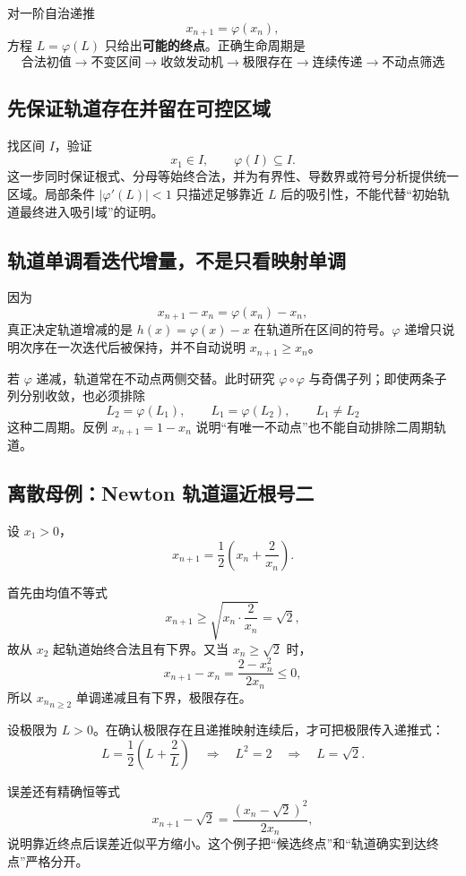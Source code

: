 \documentclass[11pt,a4paper]{ctexart}
\newcommand{\kw}[1]{\textbf{\color{deep}#1}}
\begin{document}
对一阶自治递推
\[
x_{n+1}=\varphi(x_n),
\]
方程 $L=\varphi(L)$ 只给出\kw{可能的终点}。正确生命周期是
\[
\boxed{
\text{合法初值}
\to \text{不变区间}
\to \text{收敛发动机}
\to \text{极限存在}
\to \text{连续传递}
\to \text{不动点筛选}}
\]

\subsection{先保证轨道存在并留在可控区域}

找区间 $I$，验证
\[
x_1\in I,\qquad \varphi(I)\subseteq I.
\]
这一步同时保证根式、分母等始终合法，并为有界性、导数界或符号分析提供统一区域。局部条件 $|\varphi'(L)|<1$ 只描述足够靠近 $L$ 后的吸引性，不能代替“初始轨道最终进入吸引域”的证明。

\subsection{轨道单调看迭代增量，不是只看映射单调}

因为
\[
x_{n+1}-x_n=\varphi(x_n)-x_n,
\]
真正决定轨道增减的是 $h(x)=\varphi(x)-x$ 在轨道所在区间的符号。$\varphi$ 递增只说明次序在一次迭代后被保持，并不自动说明 $x_{n+1}\ge x_n$。

若 $\varphi$ 递减，轨道常在不动点两侧交替。此时研究 $\varphi\circ\varphi$ 与奇偶子列；即使两条子列分别收敛，也必须排除
\[
L_2=\varphi(L_1),\qquad L_1=\varphi(L_2),\qquad L_1\ne L_2
\]
这种二周期。反例 $x_{n+1}=1-x_n$ 说明“有唯一不动点”也不能自动排除二周期轨道。

\subsection{离散母例：Newton 轨道逼近根号二}

设 $x_1>0$，
\[
x_{n+1}=\frac12\left(x_n+\frac2{x_n}\right).
\]

首先由均值不等式
\[
x_{n+1}\ge\sqrt{x_n\cdot\frac2{x_n}}=\sqrt2,
\]
故从 $x_2$ 起轨道始终合法且有下界。又当 $x_n\ge\sqrt2$ 时，
\[
x_{n+1}-x_n=\frac{2-x_n^2}{2x_n}\le0,
\]
所以 ${x_n}_{n\ge2}$ 单调递减且有下界，极限存在。

设极限为 $L>0$。在确认极限存在且递推映射连续后，才可把极限传入递推式：
\[
L=\frac12\left(L+\frac2L\right)
\quad\Longrightarrow\quad L^2=2
\quad\Longrightarrow\quad L=\sqrt2.
\]

误差还有精确恒等式
\[
x_{n+1}-\sqrt2
=\frac{{(x_n-\sqrt2)}^2}{2x_n},
\]
说明靠近终点后误差近似平方缩小。这个例子把“候选终点”和“轨道确实到达终点”严格分开。
\end{document}
